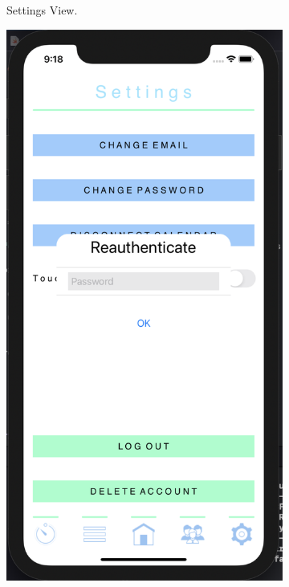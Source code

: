 \begin{figure}[H]
\begin{subfigure}[b]{0.3\textwidth}
        \caption{Settings View.}
        \label{fig:settings_app}
    \end{subfigure}
    \hfill
    \begin{subfigure}[b]{0.3\textwidth}
        \centering
        \includegraphics[width=\textwidth]{./graphics/Implementation/Settings/reauth.png}

\end{subfigure}
\end{figure}
